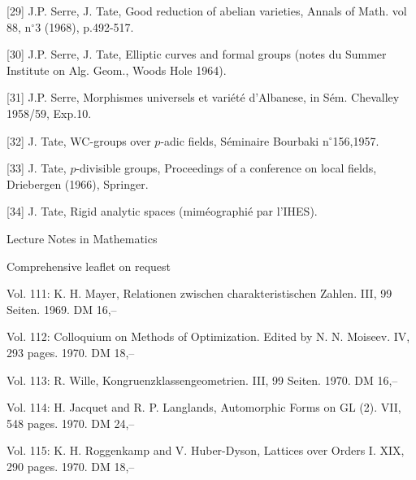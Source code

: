 {[29]} J.P. Serre, J. Tate, Good reduction of abelian varieties, Annals of Math. vol 88, n$^{\circ}$3 (1968), p.492-517.

{[30]} J.P. Serre, J. Tate, Elliptic curves and formal groups (notes du Summer Institute on Alg. Geom., Woods Hole 1964).

{[31]} J.P. Serre, Morphismes universels et variété d'Albanese, in Sém. Chevalley 1958/59, Exp.10.

{[32]} J. Tate, WC-groups over $p$-adic fields, Séminaire Bourbaki n$^{\circ}$156,1957.

{[33]} J. Tate, $p$-divisible groups, Proceedings of a conference on local fields, Driebergen (1966), Springer.

{[34]} J. Tate, Rigid analytic spaces (miméographié par l'IHES).







Lecture Notes in Mathematics


Comprehensive leaflet on request

Vol. 111: K. H. Mayer, Relationen zwischen charakteristischen Zahlen. III, 99 Seiten. 1969. DM 16,--

Vol. 112: Colloquium on Methods of Optimization. Edited by N. N. Moiseev. IV, 293 pages. 1970. DM 18,--

Vol. 113: R. Wille, Kongruenzklassengeometrien. III, 99 Seiten. 1970. DM 16,--

Vol. 114: H. Jacquet and R. P. Langlands, Automorphic Forms on GL (2). VII, 548 pages. 1970. DM 24,--

Vol. 115: K. H. Roggenkamp and V. Huber-Dyson, Lattices over Orders I. XIX, 290 pages. 1970. DM 18,--

